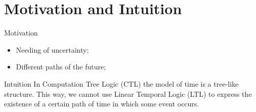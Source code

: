 \section{Motivation and Intuition}
\begin{frame}{Motivation}
	\begin{itemize}
		\item 
		{
			Needing of uncertainty;
			\pause
		} 
		\item 
		{
			Different paths of the future;
		}
	\end{itemize}
\end{frame}
\begin{frame}{Intuition}
	In Computation Tree Logic (CTL) the model of time is a tree-like structure. This way, we cannot use Linear Temporal Logic (LTL) to express the existence of a certain path of time in which some event occurs.
\end{frame}
